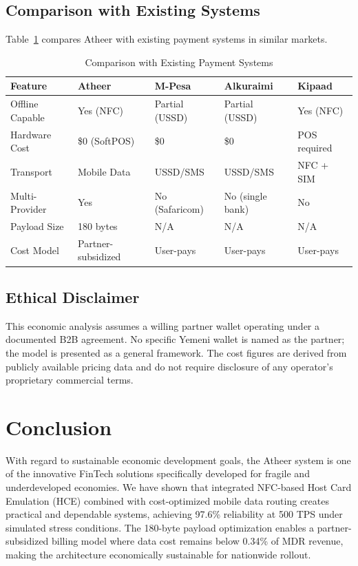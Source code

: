 \documentclass[conference,10pt]{IEEEtran}
\begin{document}
\subsection{Comparison with Existing Systems}

Table~\ref{tab:comparison} compares Atheer with existing payment systems in similar markets.

\begin{table}[t]
\caption{Comparison with Existing Payment Systems}
\label{tab:comparison}
\centering
\footnotesize
\begin{tabular}{@{}p{2.5cm}p{2.5cm}p{2.5cm}p{3cm}p{2.5cm}@{}}
\toprule
\textbf{Feature} & \textbf{Atheer} & \textbf{M-Pesa} & \textbf{Alkuraimi} & \textbf{Kipaad} \\
\midrule
Offline Capable & Yes (NFC) & Partial (USSD) & Partial (USSD) & Yes (NFC) \\
Hardware Cost & \$0 (SoftPOS) & \$0 & \$0 & POS required \\
Transport & Mobile Data & USSD/SMS & USSD/SMS & NFC + SIM \\
Multi-Provider & Yes & No (Safaricom) & No (single bank) & No \\
Payload Size & 180 bytes & N/A & N/A & N/A \\
Cost Model & Partner-subsidized & User-pays & User-pays & User-pays \\
\bottomrule
\end{tabular}
\end{table}

\subsection{Ethical Disclaimer}

This economic analysis assumes a willing partner wallet operating under a documented B2B agreement. No specific Yemeni wallet is named as the partner; the model is presented as a general framework. The cost figures are derived from publicly available pricing data and do not require disclosure of any operator's proprietary commercial terms.

\section{Conclusion}

With regard to sustainable economic development goals, the Atheer system is one of the innovative FinTech solutions specifically developed for fragile and underdeveloped economies. We have shown that integrated NFC-based Host Card Emulation (HCE) combined with cost-optimized mobile data routing creates practical and dependable systems, achieving 97.6\% reliability at 500 TPS under simulated stress conditions. The 180-byte payload optimization enables a partner-subsidized billing model where data cost remains below 0.34\% of MDR revenue, making the architecture economically sustainable for nationwide rollout.
\end{document}
